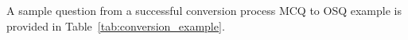 A sample question from a successful conversion process MCQ to OSQ example is provided in Table~\ref{tab:conversion_example}.







